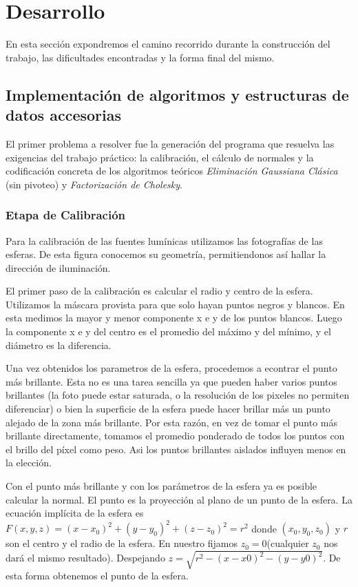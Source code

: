 \section{Desarrollo}

En esta secci\'on expondremos el camino recorrido durante la construcci\'on del trabajo, las dificultades encontradas y la forma final del mismo.

\subsection{Implementaci\'on de algoritmos y estructuras de datos accesorias}

El primer problema a resolver fue la generaci\'on del programa que resuelva las exigencias del trabajo pr\'actico: la calibraci\'on, el c\'alculo de normales y la codificaci\'on concreta de los algoritmos te\'oricos \emph{Eliminaci\'on Gaussiana Cl\'asica} (sin pivoteo) y \emph{Factorizaci\'on de Cholesky}. 

\subsubsection {Etapa de Calibraci\'on}
Para la calibraci\'on de las fuentes lum\'inicas utilizamos las fotograf\'ias de las esferas. De esta figura conocemos su geometr\'ia, permitiendonos as\'i hallar la direcci\'on de iluminaci\'on. 

El primer paso de la calibraci\'on es calcular el radio y centro de la esfera. Utilizamos la m\'ascara provista para que solo hayan puntos negros y blancos. En esta medimos la mayor y menor componente x e y de los puntos blancos. Luego la componente x e y del centro es el promedio del m\'aximo y del m\'inimo, y el di\'ametro es la diferencia.

Una vez obtenidos los parametros de la esfera, procedemos a econtrar el punto m\'as brillante. Esta no es una tarea sencilla ya que pueden haber varios puntos brillantes (la foto puede estar saturada, o la resoluci\'on de los pixeles no permiten diferenciar) o bien la superficie de la esfera puede hacer brillar m\'as un punto alejado de la zona más brillante. Por esta raz\'on, en vez de tomar el punto m\'as brillante directamente, tomamos el promedio ponderado de todos los puntos con el brillo del p\'ixel como peso. Asi los puntos brillantes aislados influyen menos en la elecci\'on.

Con el punto m\'as brillante y con los par\'ametros de la esfera ya es posible calcular la normal. El punto es la proyecci\'on al plano de un punto de la esfera. La ecuaci\'on impl\'icita de la esfera es $F(x,y,z) = (x-x_0)^2+(y-y_0)^2+(z-z_0)^2 = r^2$ donde $(x_0,y_0,z_0)$ y $r$ son el centro y el radio de la esfera. En nuestro fijamos $z_0 = 0$(cualquier $z_0$ nos dar\'a el mismo resultado). Despejando $z = \sqrt{r^2 - (x-x0)^2 - (y-y0)^2}$. De esta forma obtenemos el punto de la esfera.

